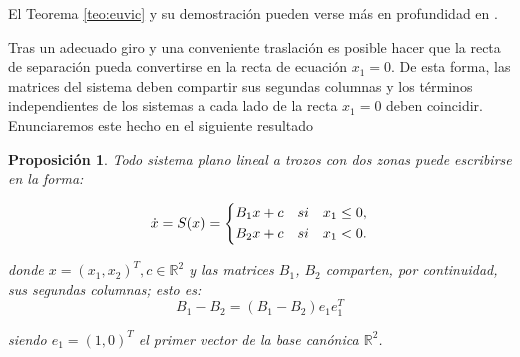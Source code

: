 \documentclass[12pt,a4paper]{report} %
\newtheorem{proposicion}{Proposición}[chapter]
\newcommand{\eref}[1]{\hyperref[#1]{\textcolor{blue}{(\ref*{#1})}}}
\newcommand{\eref}[1]{\hyperref[#1]{\textcolor{blue}{\textit{(\ref*{#1})}}}}
\begin{document}
	\noindent El Teorema \ref{teo:euvic} y su demostración pueden verse más en profundidad en \cite{docvic}.

	
	\vspace{0.5cm} Tras un adecuado giro y una conveniente traslación es posible hacer que la recta de separación pueda convertirse en la recta de ecuación $x_1=0$. De esta forma, las matrices del sistema deben compartir sus segundas columnas y los términos independientes de los sistemas a cada lado de la recta $x_1=0$ deben coincidir. Enunciaremos este hecho en el siguiente resultado
	
	\vspace{0.5cm}\begin{proposicion}
		Todo sistema plano lineal a trozos con dos zonas puede escribirse en la forma:
	
	\begin{equation}
		\dot{x}=S(x)=
		\label{eq:lien}
		\scalebox{1}{$\displaystyle
			\left\{
			\begin{aligned}
				B_1x+c\quad si \quad x_1 \leq 0, \\
				B_2x+c\quad si \quad x_1 < 0.
			\end{aligned}
			\right.
			$}
	\end{equation}\smallskip
	
	\noindent donde $x=(x_1,x_2)^T, c\in \mathbb{R}^2$ y las matrices $B_1$, $B_2$ comparten, por continuidad, sus segundas columnas; esto es:
	\begin{equation}
		B_1-B_2 = \left(B_1-B_2\right)e_1e_1^T
	\end{equation}
	
	\noindent siendo $e_1=(1,0)^T$ el primer vector de la base canónica $\mathbb{R}^2$.
    \end{proposicion}\smallskip
\end{document}
